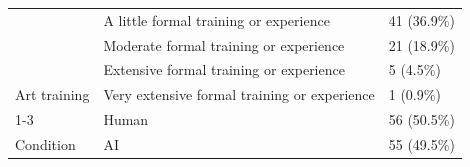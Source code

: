 \begin{table}[!h]
\begin{tabular}[t]{lll}
 & A little formal training or experience & 41 (36.9\%)\\

 & Moderate formal training or experience & 21 (18.9\%)\\

 & Extensive formal training or experience & 5 (4.5\%)\\

\multirow{-5}{*}{\raggedright\arraybackslash Art training} & Very extensive formal training or experience & 1 (0.9\%)\\
\cmidrule{1-3}
 & Human & 56 (50.5\%)\\

\multirow{-2}{*}{\raggedright\arraybackslash Condition} & AI & 55 (49.5\%)\\
\bottomrule
\end{tabular}
\end{table}